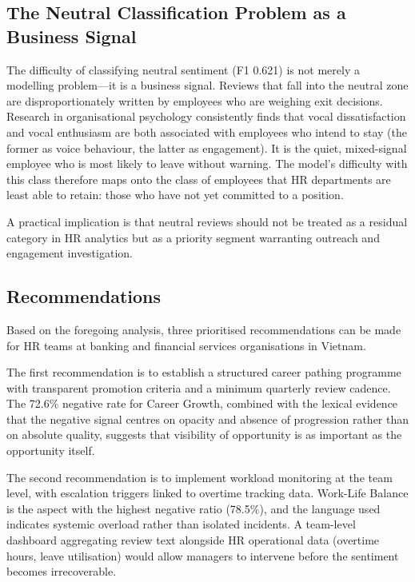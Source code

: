 \documentclass[12pt, a4paper]{article}
\begin{document}
\subsection{The Neutral Classification Problem as a Business Signal}

The difficulty of classifying neutral sentiment (F1 0.621) is not merely a modelling problem---it is a business signal. Reviews that fall into the neutral zone are disproportionately written by employees who are weighing exit decisions. Research in organisational psychology consistently finds that vocal dissatisfaction and vocal enthusiasm are both associated with employees who intend to stay (the former as voice behaviour, the latter as engagement). It is the quiet, mixed-signal employee who is most likely to leave without warning. The model's difficulty with this class therefore maps onto the class of employees that HR departments are least able to retain: those who have not yet committed to a position.

A practical implication is that neutral reviews should not be treated as a residual category in HR analytics but as a priority segment warranting outreach and engagement investigation.

\subsection{Recommendations}

Based on the foregoing analysis, three prioritised recommendations can be made for HR teams at banking and financial services organisations in Vietnam.

The first recommendation is to establish a structured career pathing programme with transparent promotion criteria and a minimum quarterly review cadence. The 72.6\% negative rate for Career Growth, combined with the lexical evidence that the negative signal centres on opacity and absence of progression rather than on absolute quality, suggests that visibility of opportunity is as important as the opportunity itself.

The second recommendation is to implement workload monitoring at the team level, with escalation triggers linked to overtime tracking data. Work-Life Balance is the aspect with the highest negative ratio (78.5\%), and the language used indicates systemic overload rather than isolated incidents. A team-level dashboard aggregating review text alongside HR operational data (overtime hours, leave utilisation) would allow managers to intervene before the sentiment becomes irrecoverable.
\end{document}
